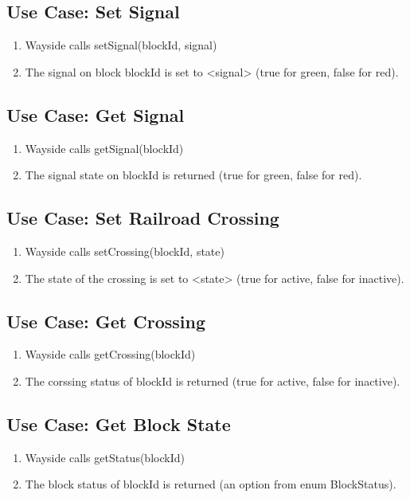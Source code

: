 \documentclass{scrreprt}
\begin{document}
\subsection{Use Case: Set Signal}
\begin{enumerate}
	\item Wayside calls setSignal(blockId, signal)
	\item The signal on block blockId is set to <signal> (true for green, false for red).
\end{enumerate}

\subsection{Use Case: Get Signal}
\begin{enumerate}
	\item Wayside calls getSignal(blockId)
	\item The signal state on blockId is returned (true for green, false for red).
\end{enumerate}

\subsection{Use Case: Set Railroad Crossing}
\begin{enumerate}
	\item Wayside calls setCrossing(blockId, state)
	\item The state of the crossing is set to <state> (true for active, false for inactive).
\end{enumerate}

\subsection{Use Case: Get Crossing}
\begin{enumerate}
	\item Wayside calls getCrossing(blockId)
	\item The corssing status of blockId is returned (true for active, false for inactive).
\end{enumerate}

\subsection{Use Case: Get Block State}
\begin{enumerate}
	\item Wayside calls getStatus(blockId)
	\item The block status of blockId is returned (an option from enum BlockStatus).
\end{enumerate}
\end{document}
